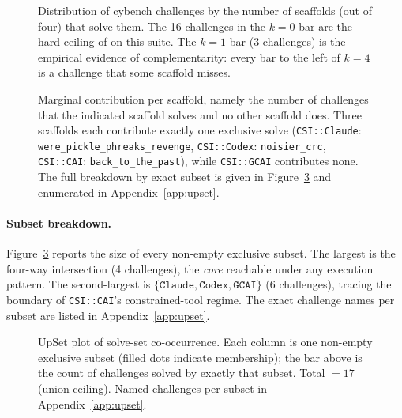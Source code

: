 \begin{figure}[t]
\centering
\resizebox{0.95\textwidth}{!}{}
\caption{Distribution of cybench challenges by the number of scaffolds (out of four) that solve them. The 16 challenges in the $k{=}0$ bar are the hard ceiling of \aliasmini{} on this suite. The $k{=}1$ bar (3 challenges) is the empirical evidence of complementarity: every bar to the left of $k{=}4$ is a challenge that some scaffold misses.}
\label{fig:solves-by-k}
\end{figure}

\begin{figure}[t]
\centering

\caption{Marginal contribution per scaffold, namely the number of challenges that the indicated scaffold solves and no other scaffold does. Three scaffolds each contribute exactly one exclusive solve (\texttt{CSI::Claude}: \texttt{were\_pickle\_phreaks\_revenge}, \texttt{CSI::Codex}: \texttt{noisier\_crc}, \texttt{CSI::CAI}: \texttt{back\_to\_the\_past}), while \texttt{CSI::GCAI} contributes none. The full breakdown by exact subset is given in Figure~\ref{fig:upset} and enumerated in Appendix~\ref{app:upset}.}
\label{fig:marginal}
\end{figure}

\paragraph{Subset breakdown.}\label{sec:upset}

Figure~\ref{fig:upset} reports the size of every non-empty exclusive subset. The largest is the four-way intersection (4 challenges), the \emph{core} reachable under any execution pattern. The second-largest is $\{\texttt{Claude}, \texttt{Codex}, \texttt{GCAI}\}$ (6 challenges), tracing the boundary of \texttt{CSI::CAI}'s constrained-tool regime. The exact challenge names per subset are listed in Appendix~\ref{app:upset}.

\begin{figure}[t!]
\centering
\resizebox{\columnwidth}{!}{}
\caption{UpSet plot of solve-set co-occurrence. Each column is one non-empty exclusive subset (filled dots indicate membership); the bar above is the count of challenges solved by exactly that subset. Total $= 17$ (union ceiling). Named challenges per subset in Appendix~\ref{app:upset}.}
\label{fig:upset}
\end{figure}

